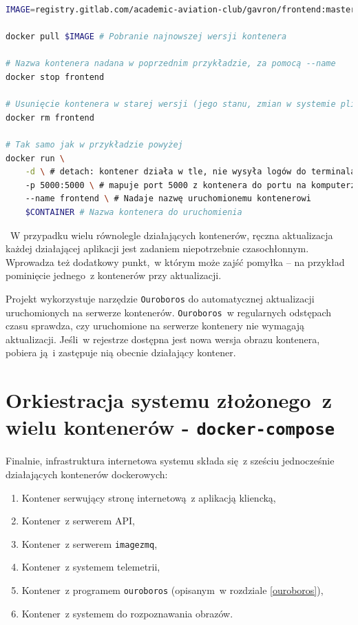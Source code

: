 \begin{lstlisting}[language=bash, label=list:docker_update_container,caption={Aktualizacja kontenerów}, basicstyle=\footnotesize\ttfamily]
IMAGE=registry.gitlab.com/academic-aviation-club/gavron/frontend:master

docker pull $IMAGE # Pobranie najnowszej wersji kontenera

# Nazwa kontenera nadana w poprzednim przykładzie, za pomocą --name
docker stop frontend

# Usunięcie kontenera w starej wersji (jego stanu, zmian w systemie plików)
docker rm frontend

# Tak samo jak w przykładzie powyżej
docker run \
    -d \ # detach: kontener działa w tle, nie wysyła logów do terminala
    -p 5000:5000 \ # mapuje port 5000 z kontenera do portu na komputerze  
    --name frontend \ # Nadaje nazwę uruchomionemu kontenerowi
    $CONTAINER # Nazwa kontenera do uruchomienia 
\end{lstlisting}
~W przypadku wielu równolegle działających kontenerów, ręczna aktualizacja 
każdej działającej aplikacji jest zadaniem niepotrzebnie czasochłonnym.
Wprowadza też dodatkowy punkt,~w którym może zajść pomyłka -- na przykład
pominięcie jednego~z kontenerów przy aktualizacji.

Projekt wykorzystuje narzędzie \texttt{Ouroboros} do automatycznej aktualizacji
uruchomionych na serwerze kontenerów. \texttt{Ouroboros}~w regularnych odstępach
czasu sprawdza, czy uruchomione na serwerze kontenery nie wymagają aktualizacji.
Jeśli~w rejestrze dostępna jest nowa wersja obrazu kontenera, pobiera ją~i zastępuje
nią obecnie działający kontener.

\section{Orkiestracja systemu złożonego~z wielu kontenerów - \texttt{docker-compose}}

Finalnie, infrastruktura internetowa systemu składa się~z sześciu
jednocześnie działających kontenerów dockerowych:

\begin{enumerate}
  \item Kontener serwujący stronę internetową~z aplikacją kliencką,
  \item Kontener~z serwerem API,
  \item Kontener~z serwerem \texttt{imagezmq},
  \item Kontener~z systemem telemetrii,
  \item Kontener~z programem \texttt{ouroboros} (opisanym~w rozdziale \ref{ouroboros}),
  \item Kontener~z systemem do rozpoznawania obrazów. 
\end{enumerate}

